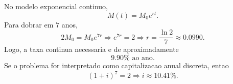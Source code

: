 No modelo exponencial continuo,
\[
M(t)=M_0e^{rt}.
\]
Para dobrar em $7$ anos,
\[
2M_0=M_0e^{7r} \Rightarrow e^{7r}=2 \Rightarrow r=\frac{\ln 2}{7} \approx 0.0990.
\]
Logo, a taxa continua necessaria e de aproximadamente
\[
9.90\% \text{ ao ano}.
\]
Se o problema for interpretado como capitalizacao anual discreta, entao
\[
(1+i)^7=2 \Rightarrow i\approx 10.41\%.
\]

